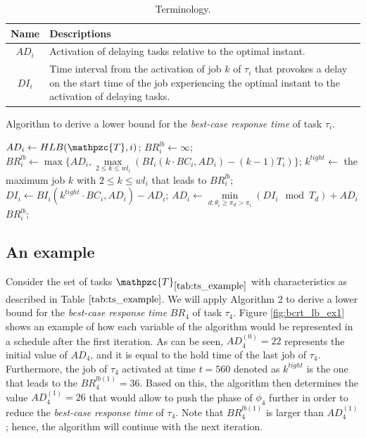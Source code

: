 \documentclass[fleqn]{article}
\begin{document}
\begin{table}[H]
	\center
	\caption{Terminology.}
	\label{tab:terminology}
	\begin{tabular}{|c | p{9cm}|}
		\hline
		Name & Descriptions \\ 
		\hline 
		\hline
		$AD_i$& Activation of delaying tasks relative to the optimal instant.\\
		\hline
		$DI_i$& Time interval from the activation of job $k$ of $\tau_i$ that provokes a delay on the start time of the job experiencing the optimal instant to the activation of delaying tasks.\\
		\hline 
	\end{tabular}
\end{table} 

\begin{algorithm}[H]
	\caption{Algorithm to derive a lower bound for the \textit{best-case response time} of task $\tau_i$.}\label{euclid}
	\begin{algorithmic}[1]
		\State $AD_i \gets HLB(\mathpzc{T},i)$;
		\State $BR^{lb}_i \gets \infty$;
		\State $BR^{lb}_i \gets \max\{ AD_i, \max \limits_{2 \leq k \leq wl_i} (BI_i(k \cdot BC_i, AD_i) - (k-1)T_i) \}$;
		\State $k^{tight} \gets$ the maximum job $k$ with $2 \leq k \leq wl_i$ that leads to $BR^{lb}_i$;
		\State $DI_i \gets BI_i(k^{tight} \cdot BC_i, AD_i) - AD_i$;
		\State $AD_i \gets \min \limits_{d:\theta_i \geq \pi_d > \pi_i} (DI_i \mod T_d) + AD_i$
		\State \Return $BR^{lb}_i$; 
		\EndProcedure
	\end{algorithmic}
\end{algorithm}

\subsection{An example}
Consider the set of tasks $\mathpzc{T}_{\ref{tab:ts_example}}$ with characteristics as described in Table $\ref{tab:ts_example}$. We will apply Algorithm 2 to derive a lower bound for the \textit{best-case response time} $BR_4$ of task $\tau_4$. Figure \ref{fig:bcrt_lb_ex1} shows an example of how each variable of the algorithm would be represented in a schedule after the first iteration. As can be seen, $AD^{(0)}_4=22$ represents the initial value of $AD_4$, and it is equal to the hold time of the last job of $\tau_4$. Furthermore, the job of $\tau_4$ activated at time $t=560$ denoted as $k^{tight}$ is the one that leads to the $BR^{lb (1)}_4=36$. Based on this, the algorithm then determines the value $AD^{(1)}_4=26$ that would allow to push the phase of $\phi_4$ further in order to reduce the \textit{best-case response time} of $\tau_4$. Note that $BR^{lb (1)}_4$ is larger than $AD^{(1)}_4$; hence, the algorithm will continue with the next iteration.
\end{document}
